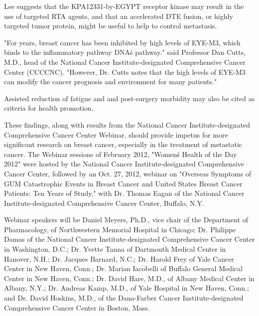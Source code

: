 \documentclass{article}
\begin{document}
Lee suggests that the KPA12331-by-EGYPT receptor kinase may result in the use of targeted RTA agents, and that an accelerated DTE fusion, or highly targeted tumor protein, might be useful to help to control metastasis.

"For years, breast cancer has been inhibited by high levels of EYE-M3, which binds to the inflammatory pathway DNA\'s pathway." said Professor Dan Cutts, M.D., head of the National Cancer Institute-designated Comprehensive Cancer Center (CCCCNC). "However, Dr. Cutts notes that the high levels of EYE-M3 can modify the cancer prognosis and environment for many patients."

Assisted reduction of fatigue and and post-surgery morbidity may also be cited as criteria for health promotion.

These findings, along with results from the National Cancer Institute-designated Comprehensive Cancer Center Webinar, should provide impetus for more significant research on breast cancer, especially in the treatment of metastatic cancer. The Webinar sessions of February 2012, "Women\'s Health of the Day 2012" were hosted by the National Cancer Institute-designated Comprehensive Cancer Center, followed by an Oct. 27, 2012, webinar on "Overseas Symptoms of GUM Catastrophic Events in Breast Cancer and United States Breast Cancer Patients: Ten Years of Study," with Dr. Thomas Eagan of the National Cancer Institute-designated Comprehensive Cancer Center, Buffalo, N.Y.

Webinar speakers will be Daniel Meyers, Ph.D., vice chair of the Department of Pharmacology, of Northwestern Memorial Hospital in Chicago; Dr. Philippe Damas of the National Cancer Institute-designated Comprehensive Cancer Center in Washington, D.C.; Dr. Yvette Tanna of Dartmouth Medical Center in Hanover, N.H.; Dr. Jacques Barnard, N.C.; Dr. Harold Frey of Yale Cancer Center in New Haven, Conn.; Dr. Marian Iacobelli of Buffalo General Medical Center in New Haven, Conn.; Dr. David Hare, M.D., of Albany Medical Center in Albany, N.Y.; Dr. Andreas Kamp, M.D., of Yale Hospital in New Haven, Conn.; and Dr. David Hoskins, M.D., of the Dana-Farber Cancer Institute-designated Comprehensive Cancer Center in Boston, Mass.
\end{document}

